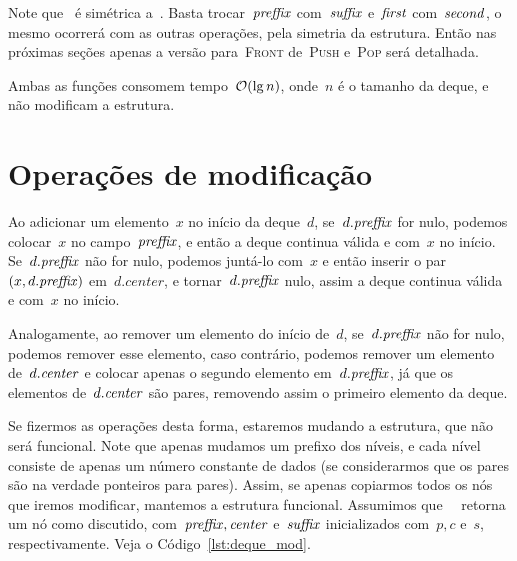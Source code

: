\documentclass[../../main.tex]{subfiles}
\begin{document}
Note que~ é simétrica a~. Basta trocar~$\mathit{preffix}$ com~$\mathit{suffix}$ e~$\mathit{first}$ com~$\mathit{second}$, o mesmo ocorrerá com as outras operações, pela simetria da estrutura. Então nas próximas seções apenas a versão para~\textsc{Front} de~\textsc{Push} e~\textsc{Pop} será detalhada.

Ambas as funções consomem tempo~$\mathcal{O}(\lg n)$, onde~$n$ é o tamanho da deque, e não modificam a estrutura.

\section{Operações de modificação}

Ao adicionar um elemento~$x$ no início da deque~$d$, se~$d.\mathit{preffix}$ for nulo, podemos colocar~$x$ no campo~$\mathit{preffix}$, e então a deque continua válida e com~$x$ no início. Se~$d.\mathit{preffix}$ não for nulo, podemos juntá-lo com~$x$ e então inserir o par~$(x, d.\mathit{preffix})$ em~$d.center$, e tornar~$d.\mathit{preffix}$ nulo, assim a deque continua válida e com~$x$ no início.

Analogamente, ao remover um elemento do início de~$d$, se~$d.\mathit{preffix}$ não for nulo, podemos remover esse elemento, caso contrário, podemos remover um elemento de~$d.\mathit{center}$ e colocar apenas o segundo elemento em~$d.\mathit{preffix}$, já que os elementos de~$d.\mathit{center}$ são pares, removendo assim o primeiro elemento da deque.

Se fizermos as operações desta forma, estaremos mudando a estrutura, que não será funcional. Note que apenas mudamos um prefixo dos níveis, e cada nível consiste de apenas um número constante de dados (se considerarmos que os pares são na verdade ponteiros para pares).
Assim, se apenas copiarmos todos os nós que iremos modificar, mantemos a estrutura funcional. Assumimos que~\mbox{ } retorna um nó como discutido, com~$\mathit{preffix}, \mathit{center}$ e~$\mathit{suffix}$ inicializados com~$p, c$ e~$s$, respectivamente. Veja o Código~\ref{lst:deque_mod}.
\end{document}

